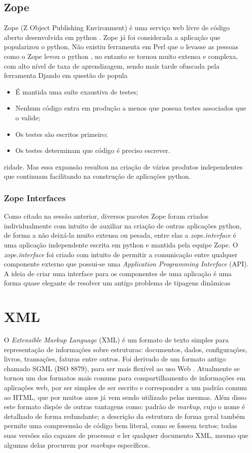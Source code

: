 \subsection{Zope}
Zope (Z Object Publishing Environment) é uma serviço web livre de código aberto desenvolvida em python \cite{Zope 2011}.
Zope já foi considerada a aplicação que popularizou o python, Não existiu ferramenta em Perl que o levasse as pessoas como o Zope levou o python \cite{Udell 2000}, no entanto se tornou muito extensa e complexa, com alto nível de taxa de aprendizagem, sendo mais tarde ofuscada pela ferramenta Djando em questão de popula\begin{itemize}
    \item{É mantida uma suíte exaustiva de testes;}
    \item{Nenhum código entra em produção a menos que possua testes associados que o valide;}
    \item{Os testes são escritos primeiro;}
    \item{Os testes determinam que código é preciso escrever.}
\end{itemize}ridade. Mas essa expansão resultou na criação de vários produtos independentes que continuam facilitando na construção de aplicações python.

\subsubsection{Zope Interfaces}
Como citado na sessão anterior, diversos pacotes Zope foram criados individualmente com intuito de auxiliar na criação de outras aplicações python, de forma a não deixá-la muito extensa ou pesada, entre elas a \textit{zope.interface} é uma aplicação independente escrita em python e mantida pela equipe Zope. 
O \textit{zope.interface} foi criado com intuito de permitir a comunicação entre qualquer componente externo que possui-se uma \textit{Application Programming Interface} (API). A ideia de criar uma interface para os componentes de uma aplicação é uma forma quase elegante de resolver um antigo problema de tipagens dinâmicas 

\section{XML}
O \textit{Extensible Markup Language} (XML) é um formato de texto simples para representação de informações sobre estruturas: documentos, dados, configurações, livros, transações, faturas entre outros. Foi derivado de um formato antigo chamado SGML (ISO 8879), para ser mais flexível ao uso Web \cite{W3C 2010}.
Atualmente se tornou um dos formatos mais comuns para compartilhamento de informações em aplicações web, por ser simples de ser escrito e corresponder a um padrão comum ao HTML, que por muitos anos já vem sendo utilizado pelas mesmas.
Além disso este formato dispõe de outras vantagens como: padrão de \textit{markup}, cujo o nome é detalhado de forma redundante; a descrição da estrutura de forma geral também permite uma compreensão de código bem literal, como se fossem textos;  todas suas versões são capazes de processar e ler qualquer documento XML, mesmo que algumas delas procurem por \textit{markups} específicos.

